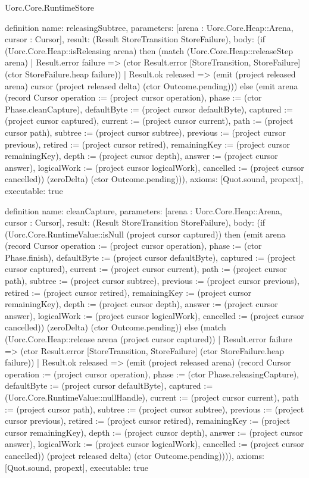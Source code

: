 \begin{lexlean}{Uorc.Core.RuntimeStore}
\begin{semanticmodule}
definition{
  name: releasingSubtree,
  parameters: [arena : Uorc.Core.Heap::Arena, cursor : Cursor],
  result: (Result StoreTransition StoreFailure),
  body: (if (Uorc.Core.Heap::isReleasing arena) then (match (Uorc.Core.Heap::releaseStep arena)
    | Result.error failure => (ctor Result.error [StoreTransition, StoreFailure] (ctor StoreFailure.heap failure))
    | Result.ok released => (emit (project released arena) cursor (project released delta) (ctor Outcome.pending))) else (emit arena (record Cursor {operation := (project cursor operation), phase := (ctor Phase.cleanCapture), defaultByte := (project cursor defaultByte), captured := (project cursor captured), current := (project cursor current), path := (project cursor path), subtree := (project cursor subtree), previous := (project cursor previous), retired := (project cursor retired), remainingKey := (project cursor remainingKey), depth := (project cursor depth), answer := (project cursor answer), logicalWork := (project cursor logicalWork), cancelled := (project cursor cancelled)}) (zeroDelta) (ctor Outcome.pending))),
  axioms: [Quot.sound, propext],
  executable: true
}

definition{
  name: cleanCapture,
  parameters: [arena : Uorc.Core.Heap::Arena, cursor : Cursor],
  result: (Result StoreTransition StoreFailure),
  body: (if (Uorc.Core.RuntimeValue::isNull (project cursor captured)) then (emit arena (record Cursor {operation := (project cursor operation), phase := (ctor Phase.finish), defaultByte := (project cursor defaultByte), captured := (project cursor captured), current := (project cursor current), path := (project cursor path), subtree := (project cursor subtree), previous := (project cursor previous), retired := (project cursor retired), remainingKey := (project cursor remainingKey), depth := (project cursor depth), answer := (project cursor answer), logicalWork := (project cursor logicalWork), cancelled := (project cursor cancelled)}) (zeroDelta) (ctor Outcome.pending)) else (match (Uorc.Core.Heap::release arena (project cursor captured))
    | Result.error failure => (ctor Result.error [StoreTransition, StoreFailure] (ctor StoreFailure.heap failure))
    | Result.ok released => (emit (project released arena) (record Cursor {operation := (project cursor operation), phase := (ctor Phase.releasingCapture), defaultByte := (project cursor defaultByte), captured := (Uorc.Core.RuntimeValue::nullHandle), current := (project cursor current), path := (project cursor path), subtree := (project cursor subtree), previous := (project cursor previous), retired := (project cursor retired), remainingKey := (project cursor remainingKey), depth := (project cursor depth), answer := (project cursor answer), logicalWork := (project cursor logicalWork), cancelled := (project cursor cancelled)}) (project released delta) (ctor Outcome.pending)))),
  axioms: [Quot.sound, propext],
  executable: true
}


\end{semanticmodule}
\end{lexlean}
